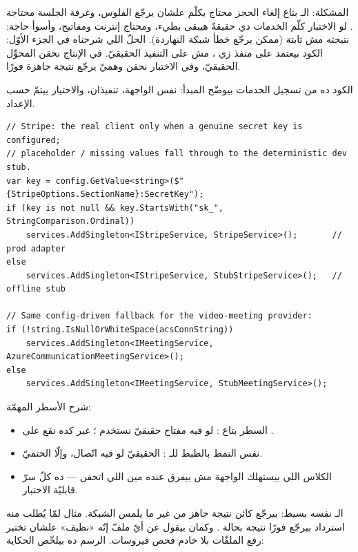 المشكلة: الـ  بتاع إلغاء الحجز محتاج يكلّم  علشان يرجّع الفلوس، وغرفة الجلسة محتاجة . لو الاختبار كلّم الخدمات دي حقيقةً هيبقى بطيء، ومحتاج إنترنت ومفاتيح، وأسوأ حاجة: نتيجته مش ثابتة (ممكن  يرجّع خطأ شبكة النهاردة). الحلّ اللي شرحناه في الجزء الأوّل: الكود بيعتمد على منفذ  زي ، مش على التنفيذ الحقيقيّ. في الإنتاج نحقن المحوِّل الحقيقيّ، وفي الاختبار نحقن  وهميّ يرجّع نتيجة جاهزة فورًا.

الكود ده من تسجيل الخدمات بيوضّح المبدأ: نفس الواجهة، تنفيذان، والاختيار بيتمّ حسب الإعداد.

\begin{english}
\begin{lstlisting}[language={[Sharp]C}]
// Stripe: the real client only when a genuine secret key is configured;
// placeholder / missing values fall through to the deterministic dev stub.
var key = config.GetValue<string>($"{StripeOptions.SectionName}:SecretKey");
if (key is not null && key.StartsWith("sk_", StringComparison.Ordinal))
    services.AddSingleton<IStripeService, StripeService>();       // prod adapter
else
    services.AddSingleton<IStripeService, StubStripeService>();   // offline stub

// Same config-driven fallback for the video-meeting provider:
if (!string.IsNullOrWhiteSpace(acsConnString))
    services.AddSingleton<IMeetingService, AzureCommunicationMeetingService>();
else
    services.AddSingleton<IMeetingService, StubMeetingService>();
\end{lstlisting}
\end{english}

شرح الأسطر المهمّة:
\begin{itemize}
  \item السطر بتاع : لو فيه مفتاح  حقيقيّ نستخدم ؛ غير كده نقع على .
  \item نفس النمط بالظبط للـ :  الحقيقيّ لو فيه اتّصال، وإلّا  الحتميّ.
  \item الكلاس اللي بيستهلك الواجهة مش بيفرق عنده مين اللي اتحقن — ده كلّ سرّ قابليّة الاختبار.
\end{itemize}

الـ  نفسه بسيط: بيرجّع كائن نتيجة جاهز من غير ما يلمس الشبكة. مثال  لمّا يُطلب منه استرداد بيرجّع فورًا نتيجة بحالة . وكمان  بيقول عن أيّ ملفّ إنّه «نظيف» علشان تختبر رفع الملفّات بلا خادم فحص فيروسات. الرسم ده بيلخّص الحكاية:

